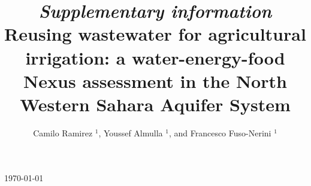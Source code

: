 \documentclass[12pt]{iopart}
\begin{document}
	
\title[\textit{SI} - Reusing wastewater in agriculture: a WEF Nexus assessment in the NWSAS]{\textit{Supplementary information}\\[12pt] \large Reusing wastewater for agricultural irrigation: a water-energy-food Nexus assessment in the North Western Sahara Aquifer System}


\author{Camilo Ramirez $^{1}$, Youssef Almulla $^{1}$, and Francesco Fuso-Nerini $^{1}$}

\address{$^{1}$ KTH Royal Institute of Technology, Stockholm, Sweden}
\vspace{10pt}
\begin{indented}
\item[]\today
\end{indented}

\tableofcontents
\end{document}

